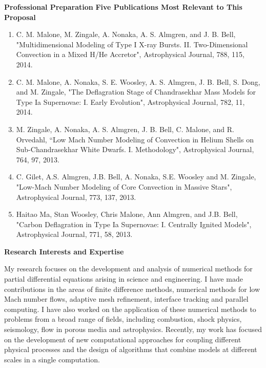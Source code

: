 \documentclass[11pt,letterpaper,english]{article}
\begin{document}
{\begin{flushleft} {\bf Professional Preparation}
\vspace{.04in}
{\bf Five Publications Most Relevant to This Proposal}
\vspace{-6pt}
\begin{enumerate} \itemsep1pt \parskip0pt 
\item C. M. Malone, M. Zingale, A. Nonaka, A. S. Almgren, and J. B. Bell, "Multidimensional Modeling of Type I X-ray Bursts. II. Two-Dimensional Convection in a Mixed H/He Accretor", Astrophysical Journal, 788, 115, 2014. \\ 
\item C. M. Malone, A. Nonaka, S. E. Woosley, A. S. Almgren, J. B. Bell, S. Dong, and M. Zingale, "The Deflagration Stage of Chandrasekhar Mass Models for Type Ia Supernovae: I. Early Evolution", Astrophysical Journal, 782, 11, 2014. \\ 
\item M. Zingale, A. Nonaka, A. S. Almgren, J. B. Bell, C. Malone, and R. Orvedahl, ``Low Mach Number Modeling of Convection in Helium Shells on Sub-Chandrasekhar White Dwarfs. I. Methodology", Astrophysical Journal, 764, 97, 2013. \\
\item C. Gilet, A.S. Almgren, J.B. Bell, A. Nonaka, S.E. Woosley and M. Zingale, "Low-Mach Number Modeling of Core Convection in Massive Stars", Astrophysical Journal, 773, 137, 2013. \\ 
\item Haitao Ma, Stan Woosley, Chris Malone, Ann Almgren, and J.B. Bell, "Carbon Deflagration in Type Ia Supernovae: I. Centrally Ignited Models", Astrophysical Journal, 771, 58, 2013. \\ 
\end{enumerate} 

\vspace{-6pt}
{\bf Research Interests and Expertise}
{\parindent 16pt

My research focuses on the development and analysis of
numerical methods for partial differential equations arising in science and engineering.
I have made contributions in the areas of finite difference methods, numerical methods for low Mach number flows, adaptive mesh refinement, interface tracking and parallel computing.
I have also worked on the application of these numerical methods to problems
from a broad range of fields, including combustion, shock physics, seismology, flow in porous media and astrophysics. 
Recently, my work has focused on the development of new computational approaches for coupling different physical processes and the design of algorithms that combine models at different scales in a single computation.  

}
\end{flushleft}}
\end{document}
